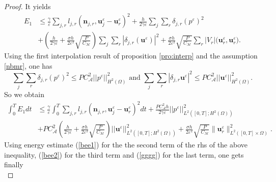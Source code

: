 \documentclass[a4paper,french,english,10pt]{article}
\newcommand\ljr{l_{jr}}
\newcommand\uu{\mathbf{u}}
\newcommand\eps{\varepsilon}
\begin{document}
\begin{proof}
It yields
\begin{equation} \label{eq:bound1bis}
\begin{aligned}
E_1 &\leq \frac{\gamma }{\eps}
\sum_{j,r}l_{j,r}(\textbf{n}_{j,r},\textbf{u}_j^{\eps}-\textbf{u}
_r^{\eps})^2 + \frac{h}{2\gamma\eps} \sum_j \sum_r %
\delta_{j,r}(p^{\eps})^2  \\
& 
+\left( \frac{h}{2 \gamma \eps} + \frac{\sigma h }{2\eps^2}\sqrt{\frac{P}{C_\mathcal M}}  \right) \sum_j \sum_r
   | \delta_{j,r}(\uu^{\eps})| ^2 %
+ \frac{\sigma h }{2\eps^2}\sqrt{\frac{P}{C_\mathcal M}} 
 \sum_r |V_r|  \big( \textbf{u}_r^{\eps},\textbf{u}_r^{\eps}\big)  .
\end{aligned}
\end{equation}
Using the first   interpolation result of proposition \ref{pro:interp} and  the assumption  \eqref{nbmr}, one has 
\[
\sum_j \sum_r  \delta_{j,r} ( p^{\eps})^2 \leq P C_{\mathcal A}^2   \vert \vert p^\eps \vert\vert^2_{H^2(\Omega)}
\mbox{ and }
\sum_j \sum_r | \delta_{j,r}\uu^{\eps}|^2 \leq P C_{\mathcal A}^2 \vert \vert \uu^\eps \vert\vert^2_{H^2(\Omega)}
.
\]
So we obtain
\begin{equation*}
\begin{aligned}
\int_0^T E_1 dt & \leq  \frac{\gamma}{\eps}
\int_0^T
\sum_{j,r}l_{j,r}(\textbf{n}_{j,r},\textbf{u}_j^{\eps}-\textbf{u}
_r^{\eps})^2 dt  +  \frac {P C_{\mathcal A}^2  h }{2\gamma \eps}%
\vert \vert p^\eps \vert\vert^2_{L^2([0,T]; H^2(\Omega) )} 
  \\
&
+ %
P C_{\mathcal A}^2 \left( \frac{h}{2 \gamma \eps} + \frac{\sigma h }{2\eps^2}\sqrt{\frac{P}{C_\mathcal M}}  \right) 
\vert \vert \uu^\eps \vert\vert^2_{L^2([0,T]; H^2(\Omega) )} 
+\frac{\sigma h  }{2\eps^2}\sqrt{\frac{P}{C_\mathcal M}}  \| \textbf{u}_r^{\eps} \|_{L^2([0,T]\times\Omega)}^2 .
\end{aligned}
\end{equation*}
Using  energy estimate (\ref{bee1})  for the the second  term of the rhs of the above inequality,  
 (\ref{bee2}) for the third term   and    (\ref{gggg}) for the last term,
one gets finally %
\begin{equation} \label{eq:si1}

\end{equation}
\end{proof}
\end{document}
